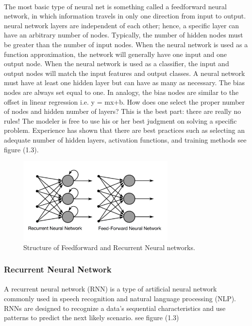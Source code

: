 \paragraph{}The most basic type of neural net is something called a feedforward neural network, in which information travels in only one direction from input to output.\newline
neural network layers are independent of each other; hence, a specific layer can have an arbitrary number of nodes. Typically, the number of hidden nodes must be greater than the number of input nodes. When the neural network is used as a function approximation, the network will generally have one input and one output node. When the neural network is used as a classifier, the input and output nodes will match the input features and output classes.\newline
A neural network must have at least one hidden layer but can have as many as necessary. The bias nodes are always set equal to one. In analogy, the bias nodes are similar to the offset in linear regression 
i.e. y = mx+b. How does one select the proper number of nodes and hidden number of layers? This is the best part: there are really no rules! The modeler is free to use his or her best judgment on solving a specific problem. Experience has shown that there are best practices such as selecting an adequate number of hidden layers, activation functions, and training methods
see figure (1.3).
\begin{figure}
	\centering
	\includegraphics[width=0.7\textwidth]{rf.png}
	\caption{Structure of Feedforward and Recurrent Neural networks.}
\end{figure}
\subsubsection{Recurrent Neural Network
}
\paragraph{}
A recurrent neural network (RNN) is a type of artificial neural network commonly used in speech recognition and natural language processing (NLP). RNNs are designed to recognize a data's sequential characteristics and use patterns to predict the next likely scenario. see figure (1.3) 
